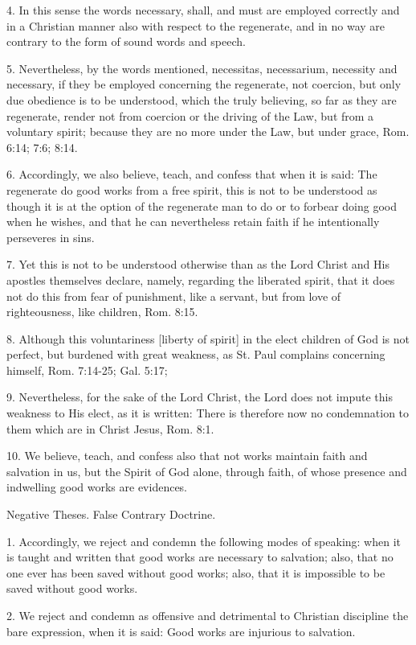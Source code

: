 4. In this sense the words necessary, shall, and must are employed correctly and in a Christian manner also with respect to the regenerate, and in no way are contrary to the form of sound words and speech.

5. Nevertheless, by the words mentioned, necessitas, necessarium, necessity and necessary, if they be employed concerning the regenerate, not coercion, but only due obedience is to be understood, which the truly believing, so far as they are regenerate, render not from coercion or the driving of the Law, but from a voluntary spirit; because they are no more under the Law, but under grace, Rom. 6:14; 7:6; 8:14.

6. Accordingly, we also believe, teach, and confess that when it is said: The regenerate do good works from a free spirit, this is not to be understood as though it is at the option of the regenerate man to do or to forbear doing good when he wishes, and that he can nevertheless retain faith if he intentionally perseveres in sins.

7. Yet this is not to be understood otherwise than as the Lord Christ and His apostles themselves declare, namely, regarding the liberated spirit, that it does not do this from fear of punishment, like a servant, but from love of righteousness, like children, Rom. 8:15.

8. Although this voluntariness [liberty of spirit] in the elect children of God is not perfect, but burdened with great weakness, as St. Paul complains concerning himself, Rom. 7:14-25; Gal. 5:17;

9. Nevertheless, for the sake of the Lord Christ, the Lord does not impute this weakness to His elect, as it is written: There is therefore now no condemnation to them which are in Christ Jesus, Rom. 8:1.

10. We believe, teach, and confess also that not works maintain faith and salvation in us, but the Spirit of God alone, through faith, of whose presence and indwelling good works are evidences.

Negative Theses.
False Contrary Doctrine.

1. Accordingly, we reject and condemn the following modes of speaking: when it is taught and written that good works are necessary to salvation; also, that no one ever has been saved without good works; also, that it is impossible to be saved without good works.

2. We reject and condemn as offensive and detrimental to Christian discipline the bare expression, when it is said: Good works are injurious to salvation.

